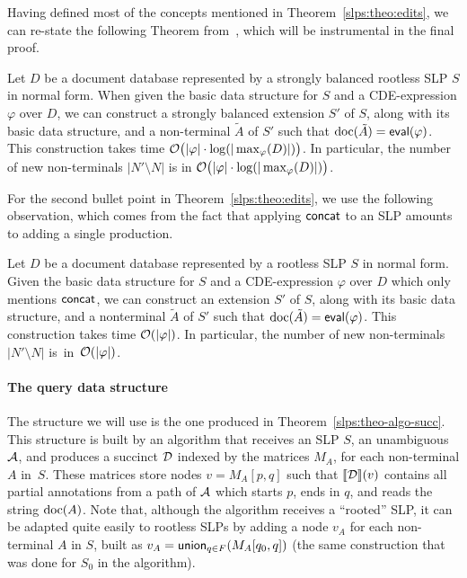 Having defined most of the concepts mentioned in Theorem~\ref{slps:theo:edits}, we can re-state the following Theorem from~\cite{SchmidS22}, which will be instrumental in the final proof.

\begin{theorem}\label{slps:theo:cedits}
	Let $D$ be a document database represented by a strongly balanced rootless SLP $S$ in normal form. When given the basic data structure for $S$ and a CDE-expression $\varphi$ over $D$, we can construct a strongly balanced extension $S'$ of $S$, along with its basic data structure, and a non-terminal $\tilde{A}$ of $S'$ such that $\operatorname{doc}(\tilde{A}) = \textsf{eval}(\varphi)$.
	This construction takes time $\mathcal{O}\big(|\varphi|\cdot \log(|\max_{\varphi}(D)|)\big)$.  In particular, the number of new non-terminals $|N'\setminus N|$ is in $\mathcal{O}\big(|\varphi|\cdot \log( |\max_{\varphi}(D)|)\big)$.
\end{theorem}


For the second bullet point in Theorem~\ref{slps:theo:edits}, we use the following observation, which comes from the fact that applying $\textsf{concat}$ to an SLP amounts to adding a single production.

\begin{observation}\label{slps:obs:concat}
	Let $D$ be a document database represented by a rootless SLP $S$ in normal form. Given the basic data structure for $S$ and a CDE-expression $\varphi$ over $D$ which only mentions $\textsf{concat}$, we can construct an extension $S'$ of $S$, along with its basic data structure, and a nonterminal $\tilde{A}$ of $S'$ such that $\operatorname{doc}(\tilde{A}) = \textsf{eval}(\varphi)$. This construction takes time $\mathcal{O}(|\varphi|)$. In particular, the number of new non-terminals $|N'\setminus N|$ is~in~$\mathcal{O}(|\varphi|)$.
\end{observation}

\paragraph{The query data structure}
The structure we will use is the one produced in Theorem~\ref{slps:theo-algo-succ}. This structure is built by an algorithm that receives an SLP $S$, an unambiguous \crt $\mathcal{A}$, and produces a succinct \dsabbr $\mathcal{D}$ indexed by the matrices $M_A$, for each non-terminal $A$ in~$S$. These matrices store nodes $v = M_A[p,q]$ such that ${\llbracket{\mathcal{D}}\rrbracket}(v)$ contains all partial annotations from a path of $\mathcal{A}$ which starts $p$, ends in $q$, and reads the string $\operatorname{doc}(A)$. 
Note that, although the algorithm receives a ``rooted'' SLP, it can be adapted quite easily to rootless SLPs by adding a node $v_A$ for each non-terminal $A$ in $S$, built as $v_A = \mathsf{union}_{q\in F}(M_A[q_0, q])$ (the same construction that was done for $S_0$ in the algorithm).

